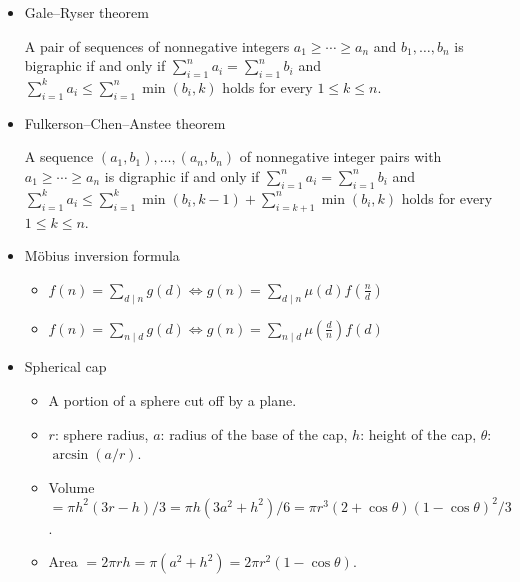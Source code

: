 \begin{itemize}
\item Gale–Ryser theorem

A pair of sequences of nonnegative integers $a_1\ge\cdots\ge a_n$ and $b_1,\ldots,b_n$ is bigraphic if and only if $\displaystyle\sum_{i=1}^n a_i=\displaystyle\sum_{i=1}^n b_i$ and $\displaystyle\sum_{i=1}^k a_i\le \displaystyle\sum_{i=1}^n\min(b_i,k)$ holds for every $1\le k\le n$.

\item Fulkerson–Chen–Anstee theorem

A sequence $(a_1,b_1),\ldots,(a_n,b_n)$ of nonnegative integer pairs with $a_1\ge\cdots\ge a_n$ is digraphic if and only if $\displaystyle\sum_{i=1}^n a_i=\displaystyle\sum_{i=1}^n b_i$ and $\displaystyle\sum_{i=1}^k a_i\le \displaystyle\sum_{i=1}^k\min(b_i,k-1)+\displaystyle\sum_{i=k+1}^n\min(b_i,k)$ holds for every $1\le k\le n$.

\item Möbius inversion formula

\begin{itemize}
    \itemsep-0.5em
  \item $f(n)=\sum_{d\mid n}g(d)\Leftrightarrow g(n)=\sum_{d\mid n}\mu(d)f(\frac{n}{d})$
  \item $f(n)=\sum_{n\mid d}g(d)\Leftrightarrow g(n)=\sum_{n\mid d}\mu(\frac{d}{n})f(d)$
\end{itemize}

\item Spherical cap

\begin{itemize}
    \itemsep-0.5em
  \item A portion of a sphere cut off by a plane.
  \item $r$: sphere radius, $a$: radius of the base of the cap, $h$: height of the cap, $\theta$: $\arcsin(a/r)$.
  \item Volume $=\pi h^2(3r-h)/3=\pi h(3a^2+h^2)/6=\pi r^3(2+\cos\theta)(1-\cos\theta)^2/3$.
  \item Area $=2\pi rh=\pi(a^2+h^2)=2\pi r^2(1-\cos\theta)$.
\end{itemize}
\end{itemize}